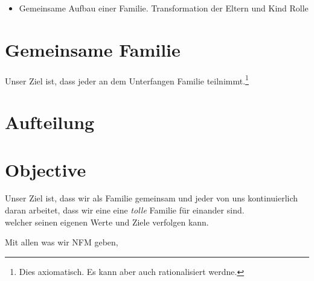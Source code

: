 \begin{itemize}
\begin{itemize}
	\item Gemeinsame Aufbau einer Familie. Transformation der Eltern und Kind Rolle 
\end{itemize}

\section{Gemeinsame Familie}
Unser Ziel ist, dass jeder an dem Unterfangen Familie teilnimmt.\footnote{Dies axiomatisch. Es kann aber auch rationalisiert werdne.} 






\section{Aufteilung}

\section{Objective} \label{part:NFM_sec:Objective}

Unser Ziel ist, dass wir als Familie gemeinsam und jeder von uns kontinuierlich daran arbeitet, dass wir eine eine \textit{tolle} Familie für einander sind.\\ 










welcher seinen eigenen Werte und Ziele verfolgen kann.

Mit allen was wir NFM geben, 



\end{itemize}
